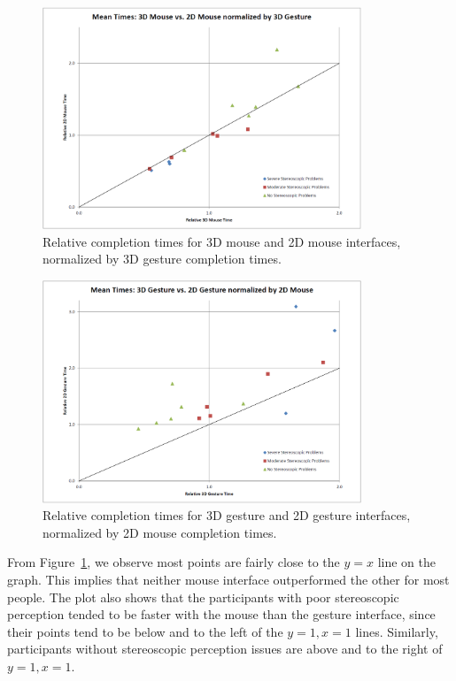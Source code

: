 \documentclass[pageno]{jpaper}
\begin{document}
\begin{figure}
\centering
\includegraphics[width=0.85\textwidth]{figures/f1.png}
\caption{Relative completion times for 3D mouse and 2D mouse interfaces,
normalized by 3D gesture completion times.}
\label{fig:mousevs3dg}
\end{figure}
\begin{figure}
\centering
\includegraphics[width=0.85\textwidth]{figures/f2.png}
\caption{Relative completion times for 3D gesture and 2D gesture interfaces,
normalized by 2D mouse completion times.}
\label{fig:gesturevs2dm}
\end{figure}

From Figure~\ref{fig:mousevs3dg}, we observe most points
are fairly close to the $y = x$ line on the graph. This implies that neither
mouse interface outperformed the other for most people. The plot also shows that the
participants with poor stereoscopic perception tended to be faster with the
mouse than the gesture interface, since their points tend to be below
and to the left of the $y = 1, x = 1$ lines. Similarly, participants without
stereoscopic perception issues are above and to the right of $y = 1, x = 1$.
\end{document}
